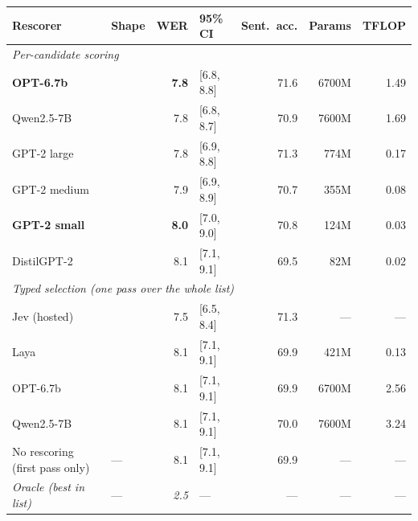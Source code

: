 \begin{tabular}{llrlrrr}
\toprule
Rescorer & Shape & WER & 95\% CI & Sent.\ acc. & Params & TFLOP \\
\midrule
\multicolumn{7}{l}{\emph{Per-candidate scoring}} \\
\quad \bf OPT-6.7b & & \bf 7.8 & [6.8, 8.8] & 71.6 & 6700M & 1.49 \\
\quad Qwen2.5-7B & & 7.8 & [6.8, 8.7] & 70.9 & 7600M & 1.69 \\
\quad GPT-2 large & & 7.8 & [6.9, 8.8] & 71.3 & 774M & 0.17 \\
\quad GPT-2 medium & & 7.9 & [6.9, 8.9] & 70.7 & 355M & 0.08 \\
\quad \bf GPT-2 small & & \bf 8.0 & [7.0, 9.0] & 70.8 & 124M & 0.03 \\
\quad DistilGPT-2 & & 8.1 & [7.1, 9.1] & 69.5 & 82M & 0.02 \\
\midrule
\multicolumn{7}{l}{\emph{Typed selection (one pass over the whole list)}} \\
\quad Jev (hosted) & & 7.5 & [6.5, 8.4] & 71.3 & --- & --- \\
\quad Laya & & 8.1 & [7.1, 9.1] & 69.9 & 421M & 0.13 \\
\quad OPT-6.7b & & 8.1 & [7.1, 9.1] & 69.9 & 6700M & 2.56 \\
\quad Qwen2.5-7B & & 8.1 & [7.1, 9.1] & 70.0 & 7600M & 3.24 \\
\midrule
No rescoring (first pass only) & --- & 8.1 & [7.1, 9.1] & 69.9 & --- & --- \\
\emph{Oracle (best in list)} & --- & \emph{2.5} & --- & --- & --- & --- \\
\bottomrule
\end{tabular}
